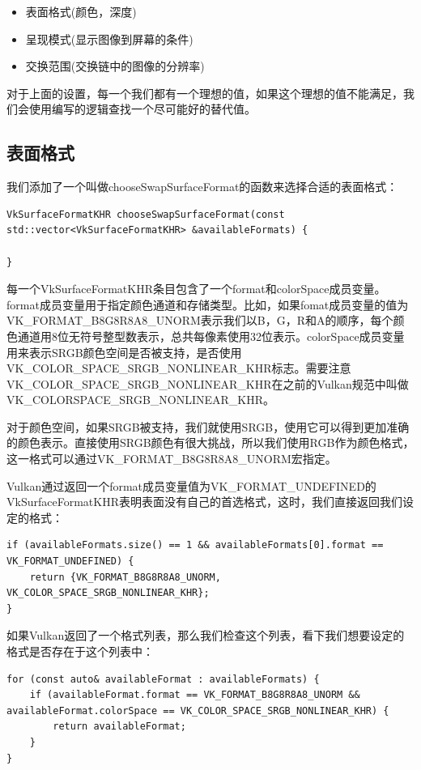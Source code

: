 \documentclass{ctexart}
\begin{document}
\begin{itemize}
	\item 表面格式(颜色，深度)
	\item 呈现模式(显示图像到屏幕的条件)
	\item 交换范围(交换链中的图像的分辨率)
\end{itemize}

对于上面的设置，每一个我们都有一个理想的值，如果这个理想的值不能满足，我们会使用编写的逻辑查找一个尽可能好的替代值。

\subsection{表面格式}

我们添加了一个叫做chooseSwapSurfaceFormat的函数来选择合适的表面格式：

\begin{lstlisting}[language={[ANSI]C}]
VkSurfaceFormatKHR chooseSwapSurfaceFormat(const std::vector<VkSurfaceFormatKHR> &availableFormats) {

}
\end{lstlisting}

每一个VkSurfaceFormatKHR条目包含了一个format和colorSpace成员变量。format成员变量用于指定颜色通道和存储类型。比如，如果fomat成员变量的值为VK\_FORMAT\_B8G8R8A8\_UNORM表示我们以B，G，R和A的顺序，每个颜色通道用8位无符号整型数表示，总共每像素使用32位表示。colorSpace成员变量用来表示SRGB颜色空间是否被支持，是否使用VK\_COLOR\_SPACE\_SRGB\_NONLINEAR\_KHR标志。需要注意VK\_COLOR\_SPACE\_SRGB\_NONLINEAR\_KHR在之前的Vulkan规范中叫做VK\_COLORSPACE\_SRGB\_NONLINEAR\_KHR。

对于颜色空间，如果SRGB被支持，我们就使用SRGB，使用它可以得到更加准确的颜色表示。直接使用SRGB颜色有很大挑战，所以我们使用RGB作为颜色格式，这一格式可以通过VK\_FORMAT\_B8G8R8A8\_UNORM宏指定。

Vulkan通过返回一个format成员变量值为VK\_FORMAT\_UNDEFINED的VkSurfaceFormatKHR表明表面没有自己的首选格式，这时，我们直接返回我们设定的格式：

\begin{lstlisting}[language={[ANSI]C}]
if (availableFormats.size() == 1 && availableFormats[0].format == VK_FORMAT_UNDEFINED) {
	return {VK_FORMAT_B8G8R8A8_UNORM, VK_COLOR_SPACE_SRGB_NONLINEAR_KHR};
}
\end{lstlisting}

如果Vulkan返回了一个格式列表，那么我们检查这个列表，看下我们想要设定的格式是否存在于这个列表中：

\begin{lstlisting}[language={[ANSI]C}]
for (const auto& availableFormat : availableFormats) {
	if (availableFormat.format == VK_FORMAT_B8G8R8A8_UNORM && availableFormat.colorSpace == VK_COLOR_SPACE_SRGB_NONLINEAR_KHR) {
		return availableFormat;
	}
}
\end{lstlisting}
\end{document}
